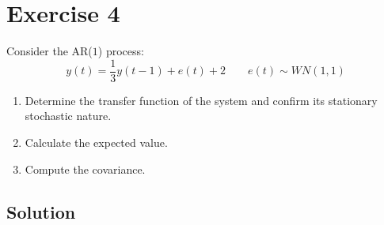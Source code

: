 \section{Exercise 4}

Consider the AR($1$) process:
\[y(t)=\dfrac{1}{3}y(t-1)+e(t)+2 \qquad e(t)\sim WN(1,1)\]
\begin{enumerate}
    \item Determine the transfer function of the system and confirm its stationary stochastic nature.
    \item Calculate the expected value.
    \item Compute the covariance.
\end{enumerate}

\subsection*{Solution}
